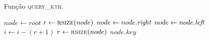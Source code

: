 \begin{algorithm}
    \caption{Função \textsc{query\_kth}.} \label{abb:query}
    \begin{algorithmic}[1]
            \State $node \leftarrow root$
            \State $r \leftarrow \Call{rsize}{node}$
                    \State $node \leftarrow node.\textit{right}$
                \Else
                    \State $node \leftarrow node.\textit{left}$
                    \State $i \leftarrow i - (r + 1)$
                \EndIf
                \State $r \leftarrow \Call{rsize}{node}$
            \EndWhile
            \State \Return $node.key$
        \EndFunction
    \end{algorithmic}
\end{algorithm}